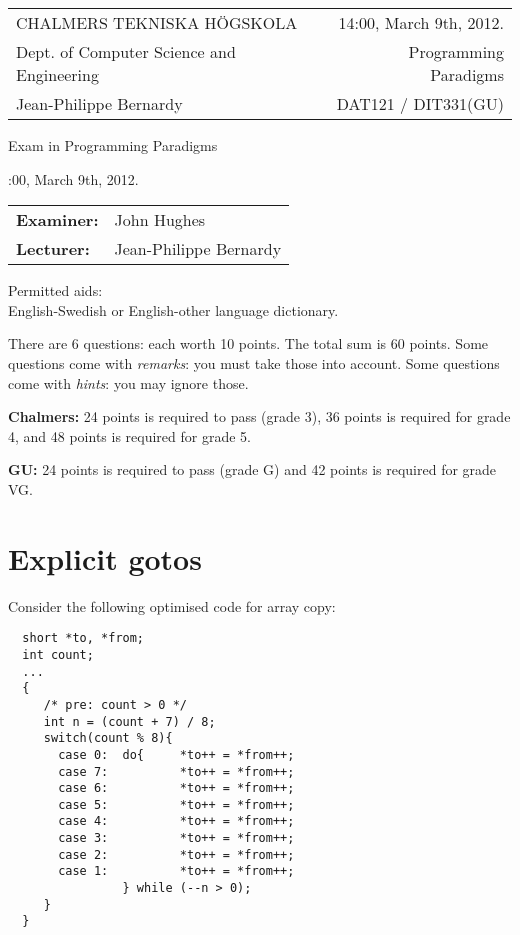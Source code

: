 \documentclass{article}
\begin{document}
\newcommand{\examtime}{14:00, March 9th, 2012}
\newcommand{\points}[1]{\marginpar{\bf #1 points}}
\noindent
\begin{tabular}{lr}
CHALMERS TEKNISKA H\"OGSKOLA &\examtime{}.\\
Dept. of Computer Science and Engineering & Programming Paradigms\\
Jean-Philippe Bernardy                 & DAT121 / DIT331(GU) \\
\end{tabular}

\vspace{2.5cm} \noindent
\begin{center} {\LARGE
Exam in Programming Paradigms}
\end{center}

\vspace{1.5cm}

\noindent
\examtime{}.\\
\begin{tabular}{ll}
\textbf{Examiner:} &  John Hughes  \\
\textbf{Lecturer:} & Jean-Philippe Bernardy
\end{tabular}
\vspace{1cm}

\noindent
Permitted aids:\\
English-Swedish or English-other language dictionary.

There are 6 questions: each worth 10 points. The total sum is 60
points.  Some questions come with \emph{remarks}: you must take those
into account.  Some questions come with \emph{hints}: you may ignore
those.


\textbf{Chalmers:}
24 points is required to pass (grade 3), 36 points is required for
grade 4, and 48 points is required for grade 5. 

\textbf{GU:} 
24 points is required to pass (grade G) and 42 points is
required for grade VG.


\newpage


\section{Explicit gotos}

Consider the following optimised code for array copy:
\begin{verbatim}
  short *to, *from;
  int count;
  ...
  {
     /* pre: count > 0 */
     int n = (count + 7) / 8;
     switch(count % 8){
       case 0:	do{     *to++ = *from++;
       case 7:	        *to++ = *from++;
       case 6:	        *to++ = *from++;
       case 5:	        *to++ = *from++;
       case 4:	        *to++ = *from++;
       case 3:	        *to++ = *from++;
       case 2:	        *to++ = *from++;
       case 1:	        *to++ = *from++;
                } while (--n > 0);
     }
  }
\end{verbatim}
\end{document}
